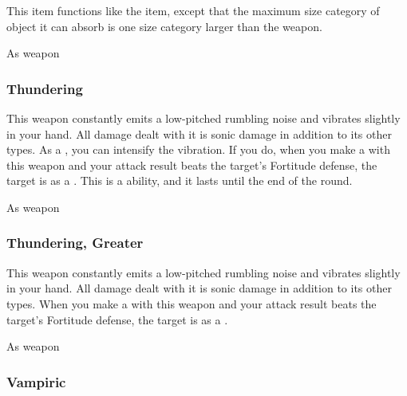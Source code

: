 This item functions like the  item, except that the maximum size category of object it can absorb is one size category larger than the weapon.



 


 As weapon


\lowercase{\hypertarget{item:Thundering}{}}\label{item:Thundering}
\hypertarget{item:Thundering}{\subsubsection{Thundering\hfill{}}}

This weapon constantly emits a low-pitched rumbling noise and vibrates slightly in your hand.
All damage dealt with it is sonic damage in addition to its other types.
As a , you can intensify the vibration.
If you do, when you make a  with this weapon and your attack result beats the target's Fortitude defense, the target is \deafened as a .
This is a  ability, and it lasts until the end of the round.



 


 As weapon


\lowercase{\hypertarget{item:Thundering, Greater}{}}\label{item:Thundering, Greater}
\hypertarget{item:Thundering, Greater}{\subsubsection{Thundering, Greater\hfill{}}}

This weapon constantly emits a low-pitched rumbling noise and vibrates slightly in your hand.
All damage dealt with it is sonic damage in addition to its other types.
When you make a  with this weapon and your attack result beats the target's Fortitude defense, the target is \deafened as a .



 


 As weapon


\lowercase{\hypertarget{item:Vampiric}{}}\label{item:Vampiric}
\hypertarget{item:Vampiric}{\subsubsection{Vampiric\hfill{}}}

